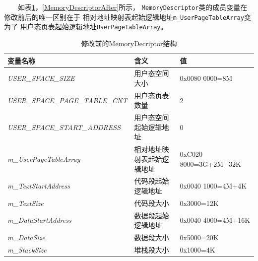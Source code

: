 　　如表\ref{MemoryDescriptorBefore}，\ref{MemoryDescriptorAfter}所示， \texttt{MemoryDescriptor}类的成员变量在修改前后的唯一区别在于 相对地址映射表起始逻辑地址\texttt{m\_UserPageTableArray}变为了
用户态页表起始逻辑地址\texttt{UserPageTableArray}。

\begin{table}[!p]
    \centering
 \begin{tabular}{lll}\toprule
    变量名称      &含义         &值        \\\midrule
   \textit{USER\_SPACE\_SIZE }&用户态空间大小            &0x0080 0000=8M               \\
   \textit{USER\_SPACE\_PAGE\_TABLE\_CNT     }&用户态页表数量            &2                            \\
   \textit{USER\_SPACE\_START\_ADDRESS       }&用户态空间起始逻辑地址        &0                            \\
   \textit{m\_UserPageTableArray             }&相对地址映射表起始逻辑地址      &0xC020 8000=3G+2M+32K                  \\
   \textit{m\_TextStartAddress               }&代码段起始逻辑地址      &0x0040 1000=4M+4K                      \\
   \textit{m\_TextSize                       }&代码段大小          &0x3000=12K                      \\
   \textit{m\_DataStartAddress               }&数据段起始逻辑地址      &0x0040 4000=4M+16K                      \\
   \textit{m\_DataSize                       }&数据段大小          &0x5000=20K                      \\
   \textit{m\_StackSize                       }&堆栈段大小          &0x1000=4K                      \\
   \bottomrule
\end{tabular}
\caption{修改前的MemoryDecriptor结构}\label{MemoryDescriptorBefore}
\end{table}


